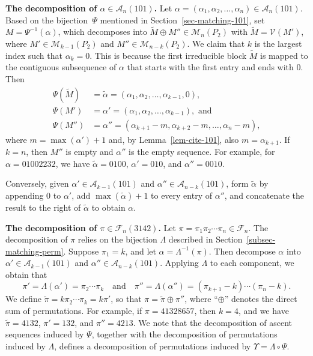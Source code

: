 \documentclass[11pt]{article}
\newcommand{\A}{\mathcal{A}}
\newcommand{\F}{\mathcal{F}}
\newcommand{\M}{\mathcal{M}}
\newcommand{\V}{\mathcal{V}}
\begin{document}
	\textbf{The decomposition of $\alpha \in \A_n(101)$.} 
	Let $\alpha=(\alpha_1, \alpha_2, \dots,\alpha_n)\in \A_n(101)$.
	Based on the bijection~$\Psi$ mentioned in Section~\ref{sec-matching-101}, set $M=\Psi^{-1}(\alpha)$, which decomposes into $\widetilde{M}\oplus M'' \in \M_{n}(P_{2})$ with $\widetilde{M}=\V(M')$, where $M'\in \M_{k-1}(P_2)$ and $M'' \in \M_{n-k}(P_2)$.
	We claim that $k$ is the largest index such that $\alpha_k=0$.
	This is because the first irreducible block $\widetilde{M}$ is mapped to the contiguous subsequence of $\alpha$ that starts with the first entry and ends with 0.
	Then
	\begin{align*}
		\Psi(\widetilde M)& =\tilde\alpha=(\alpha_1, \alpha_2,  \dots, \alpha_{k-1}, 0),\\
		\Psi(M')& =\alpha'=(\alpha_1, \alpha_2,  \dots, \alpha_{k-1}),
		\text{ and } \\
		\Psi(M'')& =\alpha''=(\alpha_{k+1}-m,\alpha_{k+2}-m,\dots,\alpha_{n}-m),
	\end{align*}
	where $m=\max(\alpha')+1$ and, by Lemma~\ref{lem-cite-101}, also $m=\alpha_{k+1}$.
    If $k=n$, then $M''$ is empty and $\alpha''$ is the empty sequence.
	For example, for $\alpha=01002232$, we have  $\widetilde{\alpha}=0100$, $\alpha'=010$, and $\alpha''=0010$.
	
	Conversely, given $\alpha'\in\A_{k-1}(101)$ and $\alpha''\in\A_{n-k}(101)$, form $\tilde\alpha$ by appending $0$ to $\alpha'$,  add $\max(\widetilde{\alpha})+1$ to every entry of $\alpha''$, and concatenate the result to the right of $\widetilde{\alpha}$ to obtain $\alpha$.
	
	\textbf{The decomposition of $\pi \in \F_n(3142)$.}
	Let $\pi = \pi_1\pi_2\cdots\pi_n \in \F_n$. The decomposition of $\pi$ relies on the bijection $\Lambda$ described in Section~\ref{subsec-matching-perm}. Suppose $\pi_1 = k$, and let $\alpha = \Lambda^{-1}(\pi)$. Then decompose $\alpha$ into $\alpha' \in \mathcal{A}_{k-1}(101)$ and $\alpha'' \in \mathcal{A}_{n-k}(101)$.
	Applying $\Lambda$ to each component, we obtain that
	\[
	\pi' = \Lambda(\alpha') = \pi_2\cdots\pi_k
	\quad\text{and}\quad
	\pi'' = \Lambda(\alpha'') = (\pi_{k+1} - k)\cdots(\pi_n - k).
	\]
	We define $\widetilde{\pi} = k\pi_2\cdots\pi_k = k\pi'$, so that $\pi = \widetilde{\pi} \oplus \pi''$, where ``$\oplus$'' denotes the direct sum of permutations.
	For example, if $\pi = 41328657$, then $k = 4$, and we have $\widetilde{\pi} = 4132$, $\pi' = 132$, and $\pi'' = 4213$. We note that the decomposition of ascent sequences induced by $\Psi$, together with the decomposition of permutations induced by $\Lambda$, defines a decomposition of permutations induced by $\Upsilon = \Lambda \circ \Psi$.
	
\end{document}
